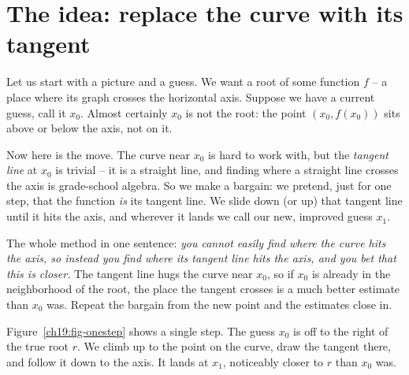 \chapterline

\section{The idea: replace the curve with its tangent}
\label{ch19:the-idea}

Let us start with a picture and a guess. We want a root of some function $f$ -- a
place where its graph crosses the horizontal axis. Suppose we have a current guess,
call it $x_0$. Almost certainly $x_0$ is not the root: the point $(x_0, f(x_0))$
sits above or below the axis, not on it.

Now here is the move. The curve near $x_0$ is hard to work with, but the
\emph{tangent line} at $x_0$ is trivial -- it is a straight line, and finding where
a straight line crosses the axis is grade-school algebra. So we make a bargain: we
pretend, just for one step, that the function \emph{is} its tangent line. We slide
down (or up) that tangent line until it hits the axis, and wherever it lands we
call our new, improved guess $x_1$.

\begin{intuitionbox}
The whole method in one sentence: \emph{you cannot easily find where the curve hits
the axis, so instead you find where its tangent line hits the axis, and you bet
that this is closer.} The tangent line hugs the curve near $x_0$, so if $x_0$ is
already in the neighborhood of the root, the place the tangent crosses is a much
better estimate than $x_0$ was. Repeat the bargain from the new point and the
estimates close in.
\end{intuitionbox}

Figure~\ref{ch19:fig-onestep} shows a single step. The guess $x_0$ is off to the
right of the true root $r$. We climb up to the point on the curve, draw the tangent
there, and follow it down to the axis. It lands at $x_1$, noticeably closer to $r$
than $x_0$ was.

